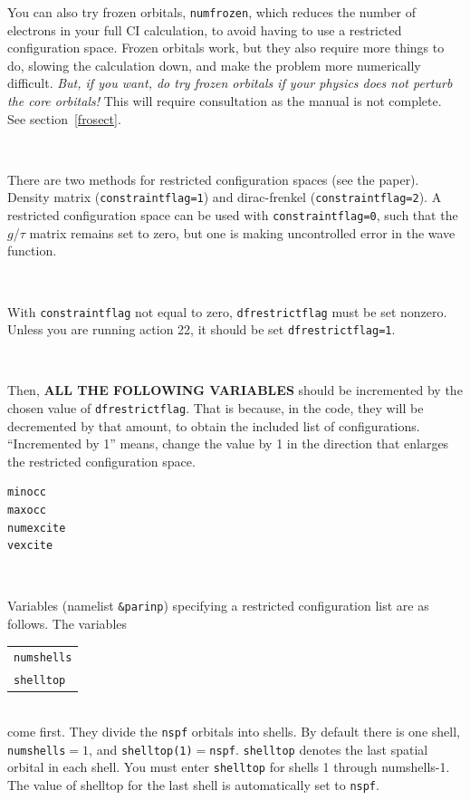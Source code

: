 \documentclass[10pt,leqno, oneside]{book}
\begin{document}
You can also try frozen orbitals, \verb#numfrozen#, which reduces the number of electrons in your full CI calculation,
to avoid having to use a restricted configuration space.
 Frozen orbitals work, but they also require more things to do, slowing the calculation down,
and make the problem more numerically difficult.  \textit{But, if you want, do try frozen orbitals if your physics does not perturb the core orbitals! } 
This will require consultation as the manual is not complete.  See section~\ref{frosect}.

\

There are two methods for restricted configuration spaces (see the paper).  Density matrix (\verb#constraintflag=1#) and dirac-frenkel (\verb#constraintflag=2#).
A restricted configuration space can be used with \verb#constraintflag=0#, such that the $g$/$\tau$ matrix remains set to zero, 
but one is making uncontrolled error in the wave function.

\

With \verb#constraintflag# not equal to zero, \verb#dfrestrictflag# must be set nonzero.  Unless you are running action 22, it should be set \verb#dfrestrictflag=1#.

\

Then, \textbf{ALL THE FOLLOWING VARIABLES} 
should be incremented by the chosen value of \verb#dfrestrictflag#.  That is because, in the code, they
will be decremented by that amount, to obtain the included list of configurations.
 ``Incremented by 1'' means, change the value by 1 in the direction that enlarges the restricted configuration
space.  

\begin{verbatim}
minocc
maxocc
numexcite
vexcite
\end{verbatim}

\

Variables (namelist \verb#&parinp#) specifying a restricted configuration list are as follows.
The variables \\
\begin{tabular}{l}
\qquad \verb#numshells#\\
\qquad \verb#shelltop# \\
\end{tabular} \\
come first.  They divide the \verb#nspf# orbitals into shells.  By default there is one shell, \verb#numshells#$=1$, 
and \verb#shelltop(1)#$=$\verb#nspf#.
 \verb#shelltop# denotes the last spatial orbital in each shell.  You must enter \verb#shelltop# for shells 1 through numshells-1.  The value of shelltop for the last shell is automatically set to \verb#nspf#.  
 
\end{document}
